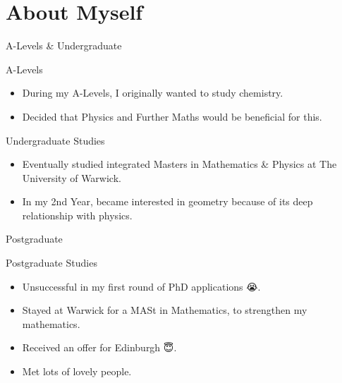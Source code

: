 \section{About Myself}

\begin{frame}{A-Levels \& Undergraduate}

    \begin{block}{A-Levels}
        \begin{itemize}
            \item During my A-Levels, I originally wanted to study chemistry.
            \item Decided that Physics and Further Maths would be beneficial for this.
        \end{itemize}
    \end{block}

    \begin{block}{Undergraduate Studies}
        \begin{itemize}
            \item Eventually studied integrated Masters in Mathematics \& Physics at The University of Warwick.
            \item In my 2nd Year, became interested in geometry because of its deep relationship with physics.
        \end{itemize}
    \end{block}

\end{frame}

\begin{frame}{Postgraduate}

    \begin{block}{Postgraduate Studies}
        \begin{itemize}
            \item Unsuccessful in my first round of PhD applications {\DejaSans 😭}.
            \item Stayed at Warwick for a MASt in Mathematics, to strengthen my mathematics.
            \item Received an offer for Edinburgh {\DejaSans 😇}.
            \item Met lots of lovely people.
        \end{itemize}
    \end{block}

\end{frame}